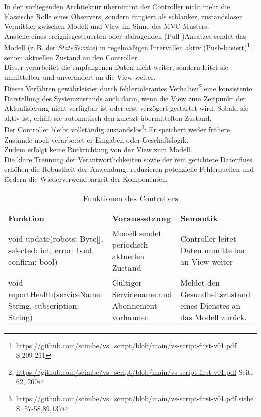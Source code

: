 In der vorliegenden Architektur übernimmt der Controller nicht mehr die klassische Rolle eines Observers, sondern fungiert als schlanker, zustandsloser Vermittler zwischen Modell und View im Sinne des MVC-Musters. \\
Anstelle eines ereignisgesteuerten oder abfragenden (Pull-)Ansatzes sendet das Modell (z.\,B. der \textit{StateService}) in regelmäßigen Intervallen aktiv (Push-basiert)\footnote{\url{https://github.com/scimbe/vs_script/blob/main/vs-script-first-v01.pdf} S.209-211} seinen aktuellen Zustand an den Controller. \\
Dieser verarbeitet die empfangenen Daten nicht weiter, sondern leitet sie unmittelbar und unverändert an die View weiter.\\
Dieses Verfahren gewährleistet durch fehlertolerantes Verhalten\footnote{\url{https://github.com/scimbe/vs_script/blob/main/vs-script-first-v01.pdf} Seite 62, 200} eine konsistente Darstellung des Systemzustands auch dann, wenn die View zum Zeitpunkt der Aktualisierung nicht verfügbar ist oder erst verzögert gestartet wird.
Sobald sie aktiv ist, erhält sie automatisch den zuletzt übermittelten Zustand.\\
Der Controller bleibt vollständig zustandslos\footnote{\url{https://github.com/scimbe/vs_script/blob/main/vs-script-first-v01.pdf} siehe S. 57-58,89,137}: Er speichert weder frühere Zustände noch verarbeitet er Eingaben oder Geschäftslogik. \\
Zudem erfolgt keine Rückrichtung von der View zum Modell. \\
Die klare Trennung der Verantwortlichkeiten sowie der rein gerichtete Datenfluss erhöhen die Robustheit der Anwendung, reduzieren potenzielle Fehlerquellen und fördern die Wiederverwendbarkeit der Komponenten.\\
\begin{table}[h!]
    \centering
    \begin{tabular}{|p{5cm}|p{5cm}|p{5cm}|}
        \hline
        \textbf{Funktion} & \textbf{Voraussetzung} & \textbf{Semantik} \\
        \hline
        void update(robots: Byte[], selected: int, error: bool, confirm: bool) & Modell sendet periodisch aktuellen Zustand & Controller leitet Daten unmittelbar an View weiter \\
        \hline
        void reportHealth(serviceName: String, subscription: String) & Gültiger Servicename und Abonnement vorhanden & Meldet den Gesundheitszustand eines Dienstes an das Modell zurück. \\
        \hline
    \end{tabular}
    \caption{Funktionen des Controllers}
    \label{tab:Controller}
\end{table}

